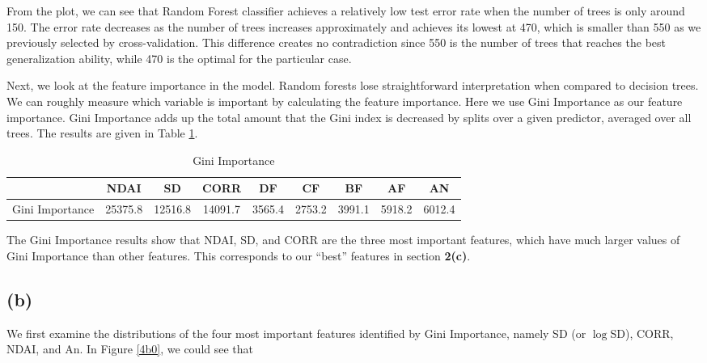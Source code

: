 \documentclass[11pt]{article}
\theoremstyle{definition}
\begin{document}
From the plot, we can see that Random Forest classifier achieves a relatively low test error rate when the number of trees is only around 150. The error rate decreases as the number of trees increases approximately and achieves its lowest at 470, which is smaller than 550 as we previously selected by cross-validation. This difference creates no contradiction since 550 is the number of trees that reaches the best generalization ability, while 470 is the optimal for the particular case. 

Next, we look at the feature importance in the model. Random forests lose straightforward interpretation when compared to decision trees. We can roughly measure which variable is important by calculating the feature importance. Here we use Gini Importance as our feature importance. Gini Importance adds up the total amount that the Gini index is decreased by splits over a given predictor, averaged over all trees. The results are given in Table \ref{gini}.

\begin{table}[h]
    \centering
    \begin{tabular}{c||c|c|c|c|c|c|c|c}

         & NDAI
         & SD
         & CORR
         & DF
         & CF
         & BF
         & AF
         & AN \\
         \hline
         Gini Importance
         & 25375.8
         & 12516.8
         & 14091.7
         & 3565.4
         & 2753.2
         & 3991.1
         & 5918.2
         & 6012.4
    \end{tabular}
    \caption{Gini Importance}
    \label{gini}
\end{table}
\FloatBarrier

The Gini Importance results show that NDAI, SD, and CORR are the three most important features, which have much larger values of Gini Importance than other features. This corresponds to our ``best'' features in section \textbf{2(c)}.

\subsection*{(b)}

We first examine the distributions of the four most important features identified by Gini Importance, namely SD (or $\log$SD), CORR, NDAI, and An. In Figure \ref{4b0}, we could see that
\end{document}

